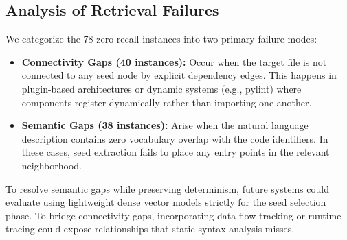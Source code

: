 \subsection{Analysis of Retrieval Failures}

We categorize the 78 zero-recall instances into two primary failure modes:
\begin{itemize}
    \item \textbf{Connectivity Gaps (40 instances):} Occur when the target file is not connected to any seed node by explicit dependency edges. This happens in plugin-based architectures or dynamic systems (e.g., pylint) where components register dynamically rather than importing one another.
    \item \textbf{Semantic Gaps (38 instances):} Arise when the natural language description contains zero vocabulary overlap with the code identifiers. In these cases, seed extraction fails to place any entry points in the relevant neighborhood.
\end{itemize}

To resolve semantic gaps while preserving determinism, future systems could evaluate using lightweight dense vector models strictly for the seed selection phase. To bridge connectivity gaps, incorporating data-flow tracking or runtime tracing could expose relationships that static syntax analysis misses.
